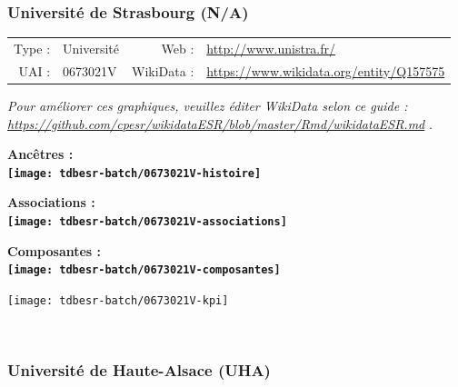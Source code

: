 \documentclass[12pt,french,]{article}
\begin{document}
\hypertarget{universituxe9-de-strasbourg-na}{%
\subsubsection{Université de Strasbourg
(N/A)}\label{universituxe9-de-strasbourg-na}}

\begin{tabular*}{\textwidth}{rp{5cm}rl}  
\hline  
Type : & Université & Web : &\href{http://www.unistra.fr/}{http://www.unistra.fr/} \\  
UAI : & 0673021V & WikiData : & \href{https://www.wikidata.org/entity/Q157575}{https://www.wikidata.org/entity/Q157575} \\  
\hline  
\end{tabular*}

\textit{\scriptsize Pour améliorer ces graphiques, veuillez éditer WikiData selon ce guide :  \href{https://github.com/cpesr/wikidataESR/blob/master/Rmd/wikidataESR.md}{https://github.com/cpesr/wikidataESR/blob/master/Rmd/wikidataESR.md}}
.

\vspace{1cm}  
\begin{minipage}[b]{0.50\textwidth}\begin{center} \bf Ancêtres : \\  
\texttt{[image: tdbesr-batch/0673021V-histoire]} \end{center}\end{minipage}\begin{minipage}[b]{0.50\textwidth}\begin{center} \bf Associations : \\  
\texttt{[image: tdbesr-batch/0673021V-associations]} \end{center}\end{minipage}

\hrulefill

\begin{center} \bf Composantes : \\  
\texttt{[image: tdbesr-batch/0673021V-composantes]} \end{center}

\begin{center}\texttt{[image: tdbesr-batch/0673021V-kpi]} \end{center}\checkoddpage

\ifoddpage \fi ~\newpage  

\hypertarget{universituxe9-de-haute-alsace-uha}{%
\subsubsection{Université de Haute-Alsace
(UHA)}\label{universituxe9-de-haute-alsace-uha}}
\end{document}
